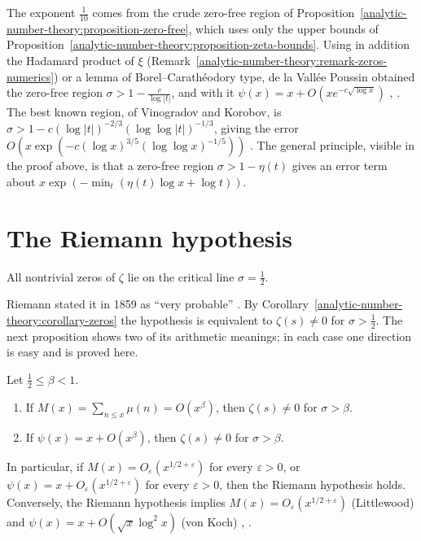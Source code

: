 \begin{remark}\label{analytic-number-theory:remark-zero-free}
The exponent $\frac{1}{10}$ comes from the crude zero-free region of Proposition~\ref{analytic-number-theory:proposition-zero-free}, which uses only the upper bounds of
Proposition~\ref{analytic-number-theory:proposition-zeta-bounds}. Using in addition the Hadamard product of $\xi$ (Remark~\ref{analytic-number-theory:remark-zeros-numerics}) or a lemma of
Borel--Carath\'eodory type, de la Vall\'ee Poussin obtained the zero-free region $\sigma > 1 - \frac{c}{\log|t|}$, and with it $\psi(x) = x + O(xe^{-c\sqrt{\log x}})$
\cite{davenport-multiplicative}, \cite{montgomery-vaughan}. The best known region, of Vinogradov and Korobov, is $\sigma > 1 - c(\log|t|)^{-2/3}(\log\log|t|)^{-1/3}$, giving the error
$O(x\exp(-c(\log x)^{3/5}(\log\log x)^{-1/5}))$ \cite{iwaniec-kowalski}. The general principle, visible in the proof above, is that a zero-free region $\sigma > 1 - \eta(t)$ gives an error term
about $x\exp(-\min_t(\eta(t)\log x + \log t))$.
\end{remark}

\section{The Riemann hypothesis}\label{analytic-number-theory:section-riemann-hypothesis}

\begin{conjecture}\label{analytic-number-theory:conjecture-riemann}
All nontrivial zeros of $\zeta$ lie on the critical line $\sigma = \frac12$.
\end{conjecture}

Riemann stated it in 1859 as ``very probable'' \cite{riemann-1859}. By Corollary~\ref{analytic-number-theory:corollary-zeros} the hypothesis is equivalent to $\zeta(s) \neq 0$ for $\sigma > \frac12$. The
next proposition shows two of its arithmetic meanings; in each case one direction is easy and is proved here.

\begin{proposition}\label{analytic-number-theory:proposition-rh-equivalent}
Let $\frac12 \leq \beta < 1$.
\begin{enumerate}
\item If $M(x) = \sum_{n \leq x}\mu(n) = O(x^\beta)$, then $\zeta(s) \neq 0$ for $\sigma > \beta$.
\item If $\psi(x) = x + O(x^\beta)$, then $\zeta(s) \neq 0$ for $\sigma > \beta$.
\end{enumerate}
In particular, if $M(x) = O_\varepsilon(x^{1/2 + \varepsilon})$ for every $\varepsilon > 0$, or $\psi(x) = x + O_\varepsilon(x^{1/2 + \varepsilon})$ for every $\varepsilon > 0$, then the Riemann hypothesis
holds. Conversely, the Riemann hypothesis implies $M(x) = O_\varepsilon(x^{1/2 + \varepsilon})$ (Littlewood) and $\psi(x) = x + O(\sqrt{x}\log^2x)$ (von Koch) \cite{titchmarsh-zeta}, \cite{von-koch-1901}.
\end{proposition}

